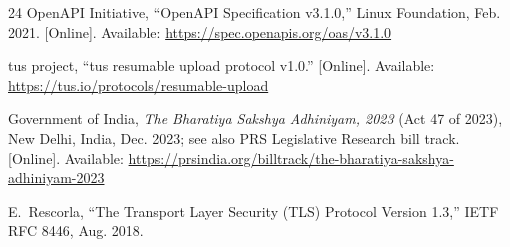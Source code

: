 \documentclass[conference]{IEEEtran}
\begin{document}
\begin{thebibliography}{24}
OpenAPI Initiative, ``OpenAPI Specification v3.1.0,'' Linux Foundation, Feb. 2021.
[Online]. Available: \url{https://spec.openapis.org/oas/v3.1.0}

tus project, ``tus resumable upload protocol v1.0.'' [Online]. Available:
\url{https://tus.io/protocols/resumable-upload}

Government of India, \emph{The Bharatiya Sakshya Adhiniyam, 2023} (Act 47 of 2023),
New Delhi, India, Dec. 2023; see also PRS Legislative Research bill track. [Online].
Available: \url{https://prsindia.org/billtrack/the-bharatiya-sakshya-adhiniyam-2023}

E.~Rescorla, ``The Transport Layer Security (TLS) Protocol Version 1.3,'' IETF RFC 8446,
Aug. 2018.

\end{thebibliography}
\end{document}
